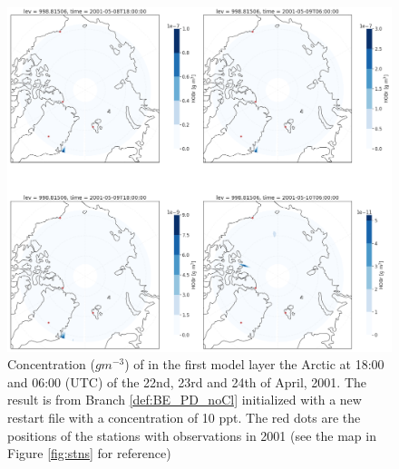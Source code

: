 \begin{figure}[h]
    \centering
    \includegraphics[width=\linewidth]{Chapter6_Results/images/Polar_StationComp_2001/HOBr/polarHOBr_step4.png}
    \caption{Concentration ($g m^{-3}$) of  in the first model layer the Arctic at 18:00 and 06:00 (UTC) of the  22nd, 23rd and 24th of April, 2001. The result is from Branch \ref{def:BE_PD_noCl} initialized with a new restart file with a  concentration of 10 ppt. The red dots are the positions of the stations with observations in 2001 (see the map in Figure \ref{fig:stns} for reference)}
    \label{fig:polarHOBr_step4}
\end{figure}